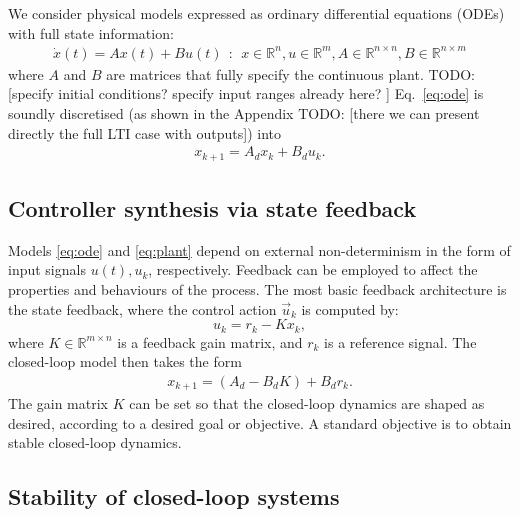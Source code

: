 \documentclass[runningheads,a4paper]{llncs}
\newcommand{\todo}[1]{{\color{red} TODO: #1}}
\begin{document}
We consider physical models expressed as ordinary differential equations (ODEs) with full state information:  
%
\begin{align}
\label{eq:ode}
\dot{x}(t) = Ax(t)+ B u(t)\ \ :\ \ x \in \mathbb{R}^{n}, u \in \mathbb{R}^m, A \in \mathbb{R}^{n \times n}, B \in \mathbb{R}^{n \times m}
\end{align}
where $A$ and $B$ are matrices that fully specify the continuous plant.  
\todo{[specify initial conditions? specify input ranges already here? ]} 
Eq.~\eqref{eq:ode} is soundly discretised (as shown in the Appendix \todo{[there we can present directly the full LTI case with outputs]}) into
%
\begin{align}
\label{eq:plant}
x_{k+1} = A_d x_k+ B_d u_k. 
\end{align}
%

\subsection{Controller synthesis via state feedback}
\label{ssec:statefeedbackcontrol}

Models \eqref{eq:ode} and \eqref{eq:plant} depend on external non-determinism in the form of input signals $u (t), u_k$, respectively. 
Feedback can be employed to affect the properties and behaviours of the process. 
The most basic feedback architecture is the state feedback, 
where the control action $\vec{u}_k$ is computed by: 
%
\begin{equation}
\label{eq:controlaction}
u_k = r_{k} - K x_k, 
\end{equation}
%
where $K \in \mathbb{R}^{m \times n}$ is a feedback gain matrix, 
and $r_{k}$ is a reference signal.   
%
The closed-loop model then takes the form 
\begin{align}
\label{eq:closedloopss}
x_{k+1} = ( A_d - B_d K ) + B_d r_k.
\end{align}
The gain matrix $K$ can be set so that the closed-loop dynamics are shaped as desired, 
according to a desired goal or objective. 
A standard objective is to obtain stable closed-loop dynamics. 

\subsection{Stability of closed-loop systems}
\label{ssec:stability}
\end{document}
